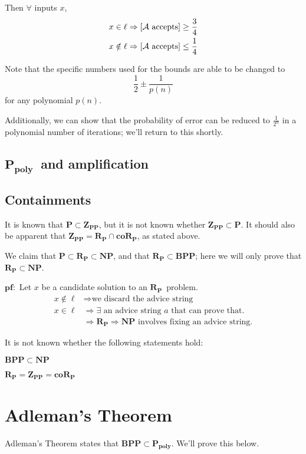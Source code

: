 \documentclass[11pt]{article}
\let\Pr\relax
\DeclareMathOperator*{\Pr}{\mathbb{P}}
\newcommand{\Pt}{\ensuremath{\mathbf{P}}}
\newcommand{\NP}{\ensuremath{\mathbf{NP}}}
\newcommand{\BPP}{\ensuremath{\mathbf{BPP}}}
\newcommand{\ZPP}{\ensuremath{\mathbf{Z_{PP}}}}
\newcommand{\RP}{\ensuremath{\mathbf{R_{P}}}}
\newcommand{\coRP}{\ensuremath{\mathbf{coR_{P}}}}
\newcommand{\Ppoly}{\ensuremath{\mathbf{P_{poly}}}}
\newcommand{\Alg}{\ensuremath{\mathcal{A}}}
\begin{document}
Then $\forall$ inputs $x$,
\begin{align*}
  x \in \ell &\Rightarrow \Pr[\Alg \text{ accepts}] \geq \frac{3}{4} \\
  x \notin \ell &\Rightarrow \Pr[\Alg \text{ accepts}] \leq \frac{1}{4} 
\end{align*}

Note that the specific numbers used for the bounds are able to be changed to 
$$\frac{1}{2} \pm \frac{1}{p(n)}$$
for any polynomial $p(n)$.

Additionally, we can show that the probability of error can be reduced to $\frac{1}{2^n}$ in a polynomial number of iterations; we'll return to this shortly.

\subsection{\Ppoly\ and amplification}

\subsection{Containments}

It is known that $\Pt\subset\ZPP$, but it is not known whether $\ZPP\subset\Pt$.
It should also be apparent that $\ZPP = \RP\cap\coRP$, as stated above.

We claim that $\Pt\subset\RP\subset\NP$, and that $\RP\subset\BPP$; here we will only prove that $\RP\subset\NP$.

$\mathbf{pf: }$
Let $x$ be a candidate solution to an \RP\ problem. 
\begin{align*}
  x\notin\ell &\Rightarrow \text{we discard the advice string}\\
  x\in\ell &\Rightarrow \exists\text{ an advice string $a$ that can prove that.}\\
  &\Rightarrow \RP \Rightarrow \NP \text{ involves fixing an advice string.} 
\end{align*}

It is not known whether the following statements hold:

$\BPP\subset\NP$

$\RP=\ZPP=\coRP$

\section{Adleman's Theorem}

Adleman's Theorem states that $\BPP\subset\Ppoly$. We'll prove this below.
\end{document}

